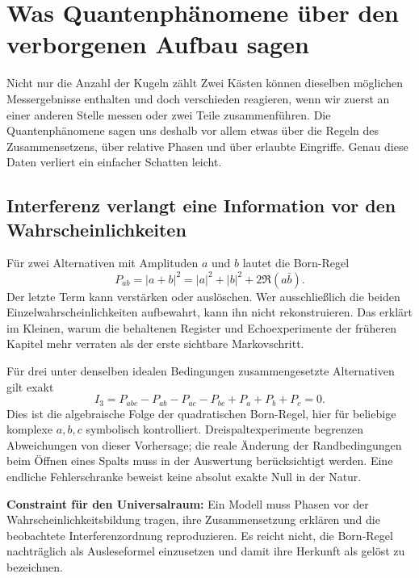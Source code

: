 \chapter{Was Quantenphänomene über den verborgenen Aufbau sagen}
\label{ch:shadow-quantum}
\begin{bild}{Nicht nur die Anzahl der Kugeln zählt}
Zwei Kästen können dieselben möglichen Messergebnisse enthalten und doch verschieden reagieren, wenn wir zuerst an einer anderen Stelle messen oder zwei Teile zusammenführen. Die Quantenphänomene sagen uns deshalb vor allem etwas über die Regeln des Zusammensetzens, über relative Phasen und über erlaubte Eingriffe. Genau diese Daten verliert ein einfacher Schatten leicht.
\end{bild}

\section{Interferenz verlangt eine Information vor den Wahrscheinlichkeiten}
Für zwei Alternativen mit Amplituden $a$ und $b$ lautet die Born-Regel
\[
 P_{ab}=|a+b|^2=|a|^2+|b|^2+2\Re(a\bar b).
\]
Der letzte Term kann verstärken oder auslöschen. Wer ausschließlich die beiden Einzelwahrscheinlichkeiten aufbewahrt, kann ihn nicht rekonstruieren. Das erklärt im Kleinen, warum die behaltenen Register und Echoexperimente der früheren Kapitel mehr verraten als der erste sichtbare Markovschritt.

Für drei unter denselben idealen Bedingungen zusammengesetzte Alternativen gilt exakt
\begin{equation}
 I_3=P_{abc}-P_{ab}-P_{ac}-P_{bc}+P_a+P_b+P_c=0.
\end{equation}
Dies ist die algebraische Folge der quadratischen Born-Regel, hier für beliebige komplexe $a,b,c$ symbolisch kontrolliert. Dreispaltexperimente begrenzen Abweichungen von dieser Vorhersage; die reale Änderung der Randbedingungen beim Öffnen eines Spalts muss in der Auswertung berücksichtigt werden. Eine endliche Fehlerschranke beweist keine absolut exakte Null in der Natur. 

\textbf{Constraint für den Universalraum:} Ein Modell muss Phasen vor der Wahrscheinlichkeitsbildung tragen, ihre Zusammensetzung erklären und die beobachtete Interferenzordnung reproduzieren. Es reicht nicht, die Born-Regel nachträglich als Ausleseformel einzusetzen und damit ihre Herkunft als gelöst zu bezeichnen.

